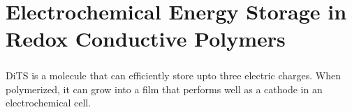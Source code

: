 \chapter{Electrochemical Energy Storage in Redox Conductive Polymers}

\paragraph*{}
DiTS is a molecule that can efficiently store upto three electric charges. When polymerized, it can grow into a film that performs well as a cathode in an electrochemical cell. 




